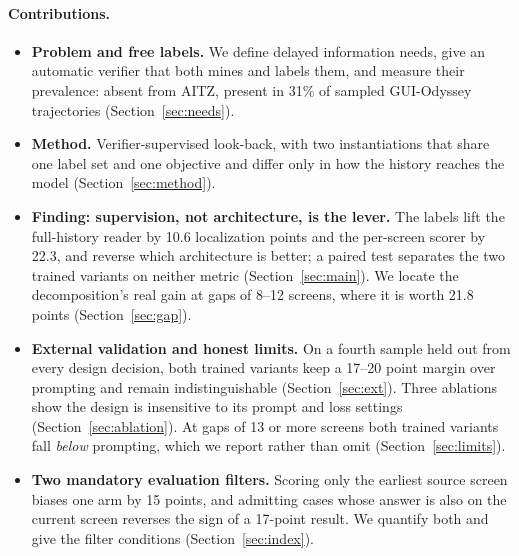 \paragraph{Contributions.}
\begin{itemize}\setlength{\itemsep}{1pt}
\item \textbf{Problem and free labels.} We define delayed information needs, give an automatic verifier that both mines and labels them, and measure their prevalence: absent from AITZ, present in 31\% of sampled GUI-Odyssey trajectories (Section~\ref{sec:needs}).
\item \textbf{Method.} Verifier-supervised look-back, with two instantiations that share one label set and one objective and differ only in how the history reaches the model (Section~\ref{sec:method}).
\item \textbf{Finding: supervision, not architecture, is the lever.} The labels lift the full-history reader by 10.6 localization points and the per-screen scorer by 22.3, and reverse which architecture is better; a paired test separates the two trained variants on neither metric (Section~\ref{sec:main}). We locate the decomposition's real gain at gaps of 8--12 screens, where it is worth 21.8 points (Section~\ref{sec:gap}).
\item \textbf{External validation and honest limits.} On a fourth sample held out from every design decision, both trained variants keep a 17--20 point margin over prompting and remain indistinguishable (Section~\ref{sec:ext}). Three ablations show the design is insensitive to its prompt and loss settings (Section~\ref{sec:ablation}). At gaps of 13 or more screens both trained variants fall \emph{below} prompting, which we report rather than omit (Section~\ref{sec:limits}).
\item \textbf{Two mandatory evaluation filters.} Scoring only the earliest source screen biases one arm by 15 points, and admitting cases whose answer is also on the current screen reverses the sign of a 17-point result. We quantify both and give the filter conditions (Section~\ref{sec:index}).
\end{itemize}

